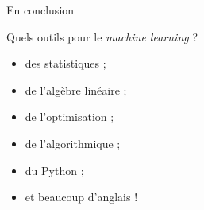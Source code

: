 \documentclass{beamer}
\begin{document}

\begin{frame}{En conclusion}

Quels outils pour le \textit{machine learning} ?

\begin{itemize}
\item des statistiques ;
\item de l'algèbre linéaire ;
\item de l'optimisation ;
\item de l'algorithmique ;
\item du Python ;
\item et beaucoup d'anglais !
\end{itemize}

\end{frame}

\end{document}
